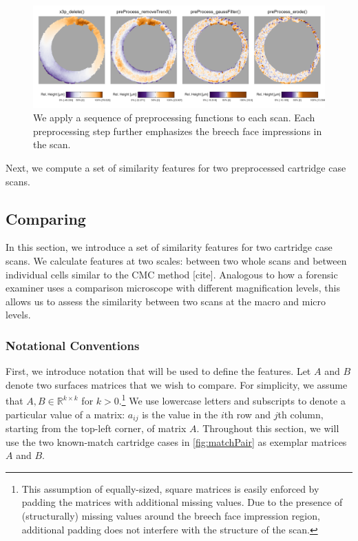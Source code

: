 \documentclass[
]{jdssv}
\begin{document}
\begin{CodeChunk}
\begin{figure}[htbp]

{\centering \includegraphics[width=\textwidth]{figures/preProcessEffect} 

}

\caption{\label{fig:preProcessEffect} We apply a sequence of preprocessing functions to each scan. Each preprocessing step further emphasizes the breech face impressions in the scan.}\label{fig:unnamed-chunk-4}
\end{figure}
\end{CodeChunk}

Next, we compute a set of similarity features for two preprocessed
cartridge case scans.

\hypertarget{comparing}{%
\subsection{Comparing}\label{comparing}}

In this section, we introduce a set of similarity features for two
cartridge case scans. We calculate features at two scales: between two
whole scans and between individual cells similar to the CMC method
{[}cite{]}. Analogous to how a forensic examiner uses a comparison
microscope with different magnification levels, this allows us to assess
the similarity between two scans at the macro and micro levels.

\hypertarget{notational-conventions}{%
\subsubsection{Notational Conventions}\label{notational-conventions}}

First, we introduce notation that will be used to define the features.
Let \(A\) and \(B\) denote two surfaces matrices that we wish to
compare. For simplicity, we assume that
\(A,B \in \mathbb{R}^{k \times k}\) for
\(k > 0\).\footnote{This assumption of equally-sized, square matrices is easily enforced by padding the matrices with additional missing values.
Due to the presence of (structurally) missing values around the breech face impression region, additional padding does not interfere with the structure of the scan.}
We use lowercase letters and subscripts to denote a particular value of
a matrix: \(a_{ij}\) is the value in the \(i\)th row and \(j\)th column,
starting from the top-left corner, of matrix \(A\). Throughout this
section, we will use the two known-match cartridge cases in
\autoref{fig:matchPair} as exemplar matrices \(A\) and \(B\).
\end{document}
